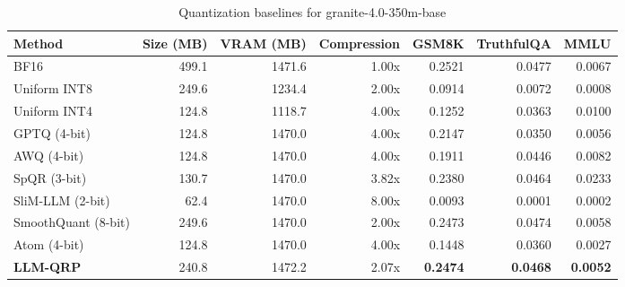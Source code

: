 \begin{table}[htbp]
  \centering
  \small
  \caption{Quantization baselines for granite-4.0-350m-base}
  \label{tab:bench_granite_4.0_350m_base}
  \begin{tabular}{lrrrrrr}
    \toprule
    \textbf{Method} & \textbf{Size (MB)} & \textbf{VRAM (MB)} & \textbf{Compression} & \textbf{GSM8K} & \textbf{TruthfulQA} & \textbf{MMLU} \\
    \midrule
    BF16 & 499.1 & 1471.6 & 1.00x & 0.2521 & 0.0477 & 0.0067 \\
    Uniform INT8 & 249.6 & 1234.4 & 2.00x & 0.0914 & 0.0072 & 0.0008 \\
    Uniform INT4 & 124.8 & 1118.7 & 4.00x & 0.1252 & 0.0363 & 0.0100 \\
    GPTQ (4-bit) & 124.8 & 1470.0 & 4.00x & 0.2147 & 0.0350 & 0.0056 \\
    AWQ (4-bit) & 124.8 & 1470.0 & 4.00x & 0.1911 & 0.0446 & 0.0082 \\
    SpQR (3-bit) & 130.7 & 1470.0 & 3.82x & 0.2380 & 0.0464 & 0.0233 \\
    SliM-LLM (2-bit) & 62.4 & 1470.0 & 8.00x & 0.0093 & 0.0001 & 0.0002 \\
    SmoothQuant (8-bit) & 249.6 & 1470.0 & 2.00x & 0.2473 & 0.0474 & 0.0058 \\
    Atom (4-bit) & 124.8 & 1470.0 & 4.00x & 0.1448 & 0.0360 & 0.0027 \\
    \midrule
    \textbf{LLM-QRP} & 240.8 & 1472.2 & 2.07x & \textbf{0.2474} & \textbf{0.0468} & \textbf{0.0052} \\
    \bottomrule
  \end{tabular}
\end{table}
